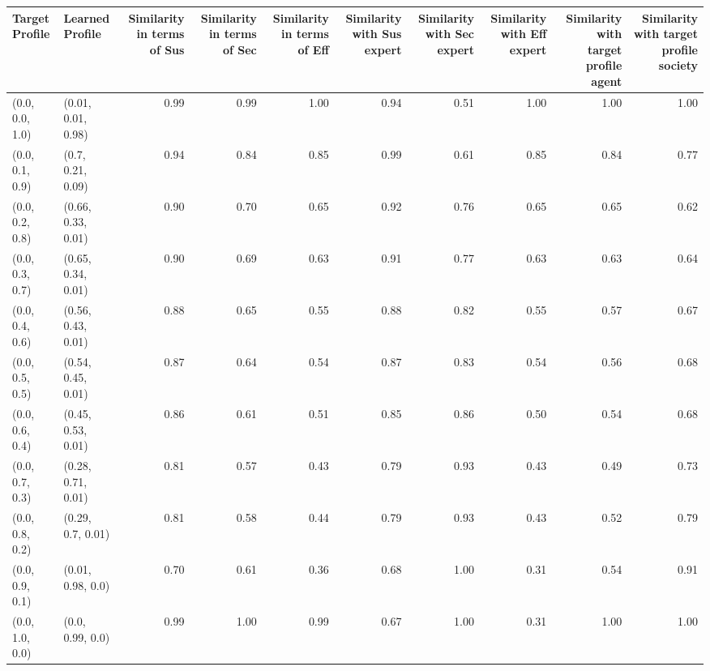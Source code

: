 \begin{tabular}{llrrrrrrrr}
\toprule
Target Profile & Learned Profile & Similarity in terms of Sus & Similarity in terms of Sec & Similarity in terms of Eff & Similarity with Sus expert & Similarity with Sec expert & Similarity with Eff expert & Similarity with target profile agent & Similarity with target profile society \\
\midrule
(0.0, 0.0, 1.0) & (0.01, 0.01, 0.98) & 0.99 & 0.99 & 1.00 & 0.94 & 0.51 & 1.00 & 1.00 & 1.00 \\
(0.0, 0.1, 0.9) & (0.7, 0.21, 0.09) & 0.94 & 0.84 & 0.85 & 0.99 & 0.61 & 0.85 & 0.84 & 0.77 \\
(0.0, 0.2, 0.8) & (0.66, 0.33, 0.01) & 0.90 & 0.70 & 0.65 & 0.92 & 0.76 & 0.65 & 0.65 & 0.62 \\
(0.0, 0.3, 0.7) & (0.65, 0.34, 0.01) & 0.90 & 0.69 & 0.63 & 0.91 & 0.77 & 0.63 & 0.63 & 0.64 \\
(0.0, 0.4, 0.6) & (0.56, 0.43, 0.01) & 0.88 & 0.65 & 0.55 & 0.88 & 0.82 & 0.55 & 0.57 & 0.67 \\
(0.0, 0.5, 0.5) & (0.54, 0.45, 0.01) & 0.87 & 0.64 & 0.54 & 0.87 & 0.83 & 0.54 & 0.56 & 0.68 \\
(0.0, 0.6, 0.4) & (0.45, 0.53, 0.01) & 0.86 & 0.61 & 0.51 & 0.85 & 0.86 & 0.50 & 0.54 & 0.68 \\
(0.0, 0.7, 0.3) & (0.28, 0.71, 0.01) & 0.81 & 0.57 & 0.43 & 0.79 & 0.93 & 0.43 & 0.49 & 0.73 \\
(0.0, 0.8, 0.2) & (0.29, 0.7, 0.01) & 0.81 & 0.58 & 0.44 & 0.79 & 0.93 & 0.43 & 0.52 & 0.79 \\
(0.0, 0.9, 0.1) & (0.01, 0.98, 0.0) & 0.70 & 0.61 & 0.36 & 0.68 & 1.00 & 0.31 & 0.54 & 0.91 \\
(0.0, 1.0, 0.0) & (0.0, 0.99, 0.0) & 0.99 & 1.00 & 0.99 & 0.67 & 1.00 & 0.31 & 1.00 & 1.00 \\
\bottomrule
\end{tabular}
